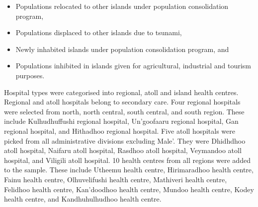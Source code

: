 
\begin{itemize}
  \item Populations relocated to other islands under population consolidation program, 
  \item Populations displaced to other islands due to tsunami,
  \item Newly inhabited islands under population consolidation program, and
  \item Populations inhibited in islands given for agricultural, industrial and tourism purposes. 
\end{itemize}

Hospital types were categorised into regional, atoll and island health centres. Regional and atoll hospitals belong to secondary care. Four regional hospitals were selected from north, north central, south central, and south region. These include Kulhudhuffushi regional hospital, Un'goofaaru regional hospital, Gan regional hospital, and Hithadhoo regional hospital. Five atoll hospitals were picked from all administrative divisions excluding Male'. They were Dhidhdhoo atoll hospital, Naifaru atoll hospital, Rasdhoo atoll hospital, Veymandoo atoll hospital, and Viligili atoll hospital. 10 health centres from all regions were added to the sample. These include Utheemu health centre, Hirimaradhoo health centre, Fainu health centre, Olhuvelifushi health centre, Mathiveri health centre, Felidhoo health centre, Kan'doodhoo health centre, Mundoo health centre, Kodey health centre, and  Kandhuhulhudhoo health centre.    

